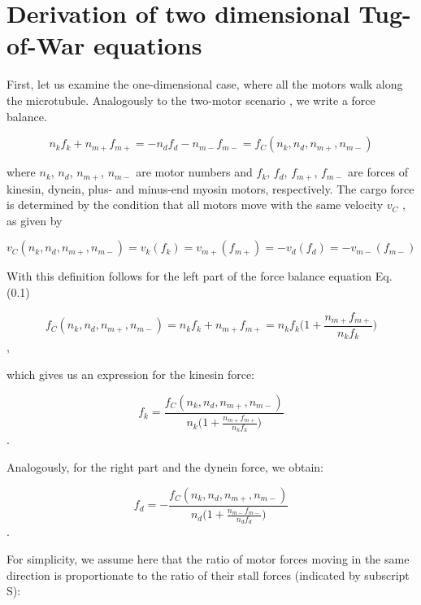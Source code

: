 \section{Derivation of two dimensional Tug-of-War equations}
\label{appendix:2DTugOfWar}

First, let us examine the one-dimensional case, where all the motors walk along the microtubule. Analogously to the two-motor scenario \cite{gennerich2007force, muller2008tug, norstrom2010unconventional}, we write a force balance.

\begin{equation}
n_kf_k + n_{m+}f_{m+} = -n_df_d - n_{m-}f_{m-} = f_C(n_k, n_d, n_{m+}, n_{m-})
\end{equation}

where $n_k$, $n_d$, $n_{m+}$, $n_{m-}$ are motor numbers and $f_k$, $f_d$, $f_{m+}$, $f_{m-}$ are forces of kinesin, dynein, plus- and minus-end myosin motors, respectively. The cargo force is determined by the condition that all motors move with the same velocity $v_C$ , as given by

\begin{equation}
v_C(n_k, n_d, n_{m+}, n_{m-}) = v_k(f_k) = v_{m+}(f_{m+}) = - v_d(f_d) = - v_{m-}(f_{m-})
\end{equation}

With this definition follows for the left part of the force balance equation Eq. (0.1)

\begin{equation}
f_C(n_k, n_d, n_{m+}, n_{m-}) = n_kf_k + n_{m+}f_{m+} = n_kf_k\big(1 + \frac{n_{m+}f_{m+}}{n_kf_{k}}\big)
\end{equation},

which gives us an expression for the kinesin force:

\begin{equation}
f_k = \frac{f_C(n_k, n_d, n_{m+}, n_{m-})}{n_k\big(1 + \frac{n_{m+}f_{m+}}{n_kf_{k}}\big)}
\end{equation}.

Analogously, for the right part and the dynein force, we obtain:

\begin{equation}
f_d = -\frac{f_C(n_k, n_d, n_{m+}, n_{m-})}{n_d\big(1 + \frac{n_{m-}f_{m-}}{n_df_{d}}\big)}
\end{equation}.

For simplicity, we assume here that the ratio of motor forces moving in the same direction is proportionate to the ratio of their stall forces (indicated by subscript S):

